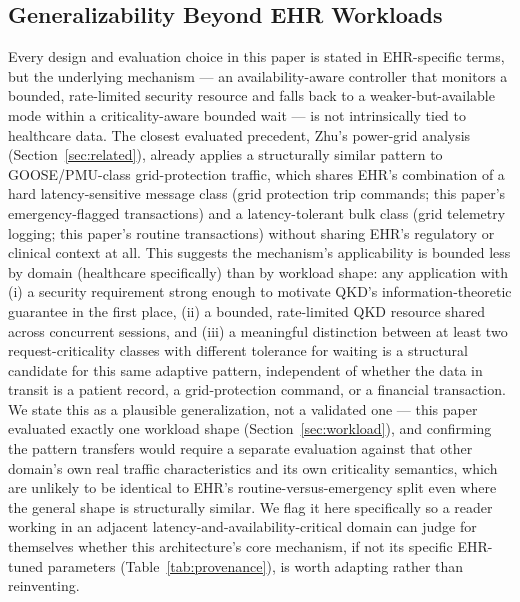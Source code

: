 \documentclass[journal]{IEEEtran}
\begin{document}
\subsection{Generalizability Beyond EHR Workloads}

Every design and evaluation choice in this paper is stated in EHR-specific terms, but the underlying mechanism --- an availability-aware controller that monitors a bounded, rate-limited security resource and falls back to a weaker-but-available mode within a criticality-aware bounded wait --- is not intrinsically tied to healthcare data. The closest evaluated precedent, Zhu's power-grid analysis~\cite{zhu2025technoeconomic} (Section~\ref{sec:related}), already applies a structurally similar pattern to GOOSE/PMU-class grid-protection traffic, which shares EHR's combination of a hard latency-sensitive message class (grid protection trip commands; this paper's emergency-flagged transactions) and a latency-tolerant bulk class (grid telemetry logging; this paper's routine transactions) without sharing EHR's regulatory or clinical context at all. This suggests the mechanism's applicability is bounded less by domain (healthcare specifically) than by workload shape: any application with (i) a security requirement strong enough to motivate QKD's information-theoretic guarantee in the first place, (ii) a bounded, rate-limited QKD resource shared across concurrent sessions, and (iii) a meaningful distinction between at least two request-criticality classes with different tolerance for waiting is a structural candidate for this same adaptive pattern, independent of whether the data in transit is a patient record, a grid-protection command, or a financial transaction. We state this as a plausible generalization, not a validated one --- this paper evaluated exactly one workload shape (Section~\ref{sec:workload}), and confirming the pattern transfers would require a separate evaluation against that other domain's own real traffic characteristics and its own criticality semantics, which are unlikely to be identical to EHR's routine-versus-emergency split even where the general shape is structurally similar. We flag it here specifically so a reader working in an adjacent latency-and-availability-critical domain can judge for themselves whether this architecture's core mechanism, if not its specific EHR-tuned parameters (Table~\ref{tab:provenance}), is worth adapting rather than reinventing.
\end{document}

